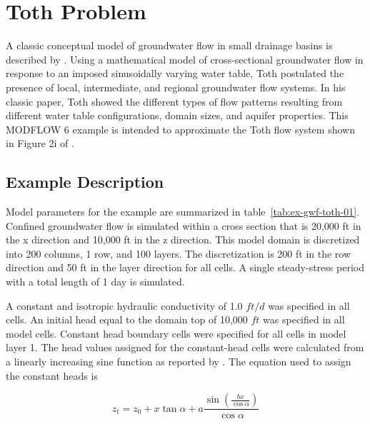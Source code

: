 \section{Toth Problem}

A classic conceptual model of groundwater flow in small drainage basins is described by \cite{toth1963}.  Using a mathematical model of cross-sectional groundwater flow in response to an imposed sinusoidally varying water table, Toth postulated the presence of local, intermediate, and regional groundwater flow systems.  In his classic paper, Toth showed the different types of flow patterns resulting from different water table configurations, domain sizes, and aquifer properties.  This MODFLOW 6 example is intended to approximate the Toth flow system shown in Figure 2i of \cite{toth1963}.

\subsection{Example Description}
Model parameters for the example are summarized in table~\ref{tab:ex-gwf-toth-01}. Confined groundwater flow is simulated within a cross section that is 20,000 ft in the x direction and 10,000 ft in the z direction.  This model domain is discretized into 200 columns, 1 row, and 100 layers. The discretization is 200 ft in the row direction and 50 ft in the layer direction for all cells. A single steady-stress period with a total length of 1 day is simulated.



A constant and isotropic hydraulic conductivity of 1.0 $ft/d$ was specified in all cells. An initial head equal to the domain top of 10,000 $ft$ was specified in all model cells. Constant head boundary cells were specified for all cells in model layer 1. The head values assigned for the constant-head cells were calculated from a linearly increasing sine function as reported by \cite{toth1963}.  The equation used to assign the constant heads is

\begin{equation}
	z_t = z_0 + x \tan \alpha + 
	a \frac{\sin \left ( \frac{b x}{\cos \alpha} \right )}{\cos \alpha}
\label{ex-gwf-toth-eq1}
\end{equation}

